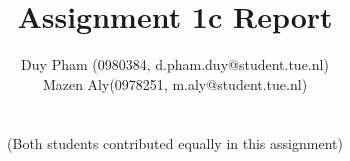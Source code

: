 \documentclass[10pt, a4paper, titlepage]{article} %
\begin{document}
    \title{\rmfamily\normalfont{}\\
    Assignment 1c Report}
    \author{Duy Pham (0980384, d.pham.duy@student.tue.nl) \\ 
    Mazen Aly(0978251, m.aly@student.tue.nl) \\\\\\
    (Both students contributed equally in this assignment)}
    \date{} %
    
    \maketitle
    

    
    
    
\end{document}
